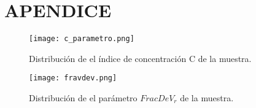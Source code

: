 \documentclass[a4paper,10pt]{article}
\begin{document}

\centering
\section*{APENDICE}
\begin{figure}[H]
 \centering
 \texttt{[image: c\_parametro.png]}
 \caption{Distribuci\'on de el \'indice de concentraci\'on C de la muestra.}
 \label{fig: 5}
\end{figure}

\begin{figure}[H]
 \centering
 \texttt{[image: fravdev.png]}
 \caption{Distribuci\'on de el par\'ametro $FracDeV_{r}$ de la muestra. }
 \label{fig: 6}
\end{figure}
\end{document}
